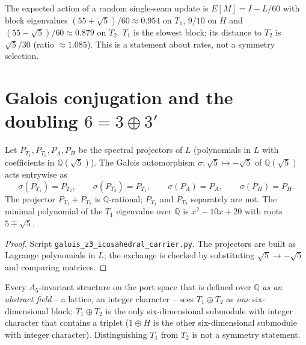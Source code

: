 \begin{remark}
The expected action of a random single-seam update is $E[M]=I-L/60$ with
block eigenvalues $(55+\sqrt5)/60\approx0.954$ on $T_1$, $9/10$ on $H$ and
$(55-\sqrt5)/60\approx0.879$ on $T_2$. $T_1$ is the slowest block; its
distance to $T_2$ is $\sqrt5/30$ (ratio $\approx1.085$). This is a
statement about rates, not a symmetry selection.
\end{remark}

\section[Galois conjugation and the doubling 6 = 3 + 3']{Galois conjugation and the doubling $6=3\oplus3'$}

\begin{theorem}\label{thm:galois}
Let $P_{T_1},P_{T_2},P_A,P_H$ be the spectral projectors of $L$
(polynomials in $L$ with coefficients in $\mathbb{Q}(\sqrt5)$). The Galois
automorphism $\sigma:\sqrt5\mapsto-\sqrt5$ of $\mathbb{Q}(\sqrt5)$ acts
entrywise as
\[
  \sigma(P_{T_1})=P_{T_2},\qquad \sigma(P_{T_2})=P_{T_1},\qquad
  \sigma(P_A)=P_A,\qquad \sigma(P_H)=P_H .
\]
The projector $P_{T_1}+P_{T_2}$ is $\mathbb{Q}$-rational; $P_{T_1}$ and
$P_{T_2}$ separately are not. The minimal polynomial of the $T_1$
eigenvalue over $\mathbb{Q}$ is $x^2-10x+20$ with roots $5\mp\sqrt5$.
\end{theorem}

\begin{proof}
Script \texttt{galois\_z3\_icosahedral\_carrier.py}. The projectors are
built as Lagrange polynomials in $L$; the exchange is checked by
substituting $\sqrt5\to-\sqrt5$ and comparing matrices.
\end{proof}

\begin{corollary}\label{cor:sechs}
Every $A_5$-invariant structure on the port space that is defined over
$\mathbb{Q}$ \emph{as an abstract field} -- a lattice, an integer
character -- sees $T_1\oplus T_2$ as \emph{one} six-dimensional block;
$T_1\oplus T_2$ is the only six-dimensional submodule with integer
character that contains a triplet ($1\oplus H$ is the other six-dimensional
submodule with integer character). Distinguishing $T_1$ from $T_2$ is not a
symmetry statement.
\end{corollary}

